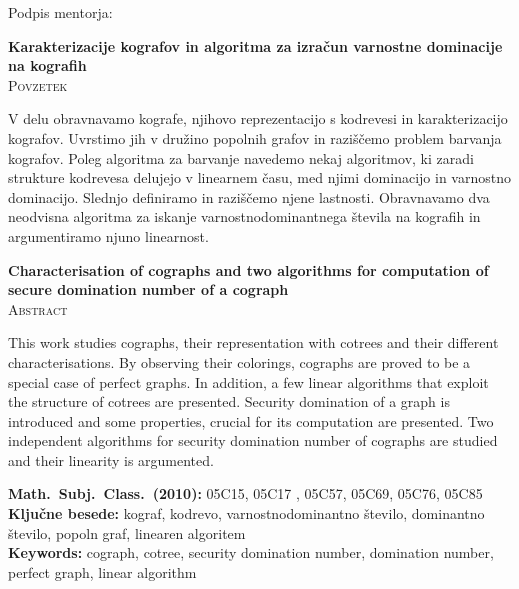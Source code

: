 \documentclass[12pt,a4paper,twoside]{article}
\newcommand{\naslovdela}{Karakterizacije kografov in algoritma za izračun varnostne dominacije na kografih}
\newcommand{\kljucnebesede}{kograf\sep kodrevo\sep varnostnodominantno število\sep dominantno število\sep popoln graf\sep linearen algoritem} %
\newcommand{\keywords}{cograph\sep cotree\sep security domination number\sep domination number\sep perfect graph\sep linear algorithm} %
\newcommand{\sep}{, }  %
\theoremstyle{definition} %
\theoremstyle{plain} %
\numberwithin{equation}{section}  %
\begin{document}
\vspace{2cm}
\hspace*{\fill} Podpis mentorja: \phantom{prostor za podpis}


\cleardoublepage
{}

\begin{center}
\textbf{\naslovdela} \\[3mm]
\textsc{Povzetek} \\[2mm]
\end{center}
V delu obravnavamo kografe, njihovo reprezentacijo s kodrevesi in karakterizacijo kografov. Uvrstimo jih v družino popolnih grafov in raziščemo problem barvanja kografov. Poleg algoritma za barvanje navedemo nekaj algoritmov, ki zaradi strukture kodrevesa delujejo v linearnem času, med njimi dominacijo in varnostno dominacijo. Slednjo definiramo in raziščemo njene lastnosti. Obravnavamo dva neodvisna algoritma za iskanje varnostnodominantnega števila na kografih in argumentiramo njuno linearnost.

\vfill
\begin{center}
\textbf{Characterisation of cographs and two algorithms for computation of secure domination number of a cograph} \\[3mm] %
\textsc{Abstract}\\[2mm]
\end{center}
This work studies cographs, their representation with cotrees and their different characterisations. By observing their colorings, cographs are proved to be a special case of perfect graphs. In addition, a few linear algorithms that exploit the structure of cotrees are presented. Security domination of a graph is introduced and some properties, crucial for its computation are presented. Two independent algorithms for security domination number of cographs are studied and their linearity is argumented.

\vfill\noindent
\textbf{Math.~Subj.~Class.~(2010):} 05C15, 05C17 , 05C57, 05C69, 05C76, 05C85 \\[1mm]
\textbf{Ključne besede:} \kljucnebesede \\[1mm]
\textbf{Keywords:} \keywords

\cleardoublepage

\setcounter{page}{1}    %
\end{document}
